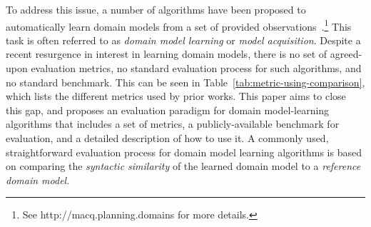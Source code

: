\documentclass[letterpaper]{article} %
\newif\ifaddcomments
\newcommand{\roni}[1]{\ifaddcomments{\textcolor{red}{[Roni: #1]}}\fi}
\newcommand{\yarin}[1]{\ifaddcomments{\textcolor{teal}{[Yarin: #1]}}\fi}
\newcommand{\cm}[1]{\ifaddcomments{\textcolor{olive}{[Christian: #1]}}\fi}
\begin{document}
To address this issue, a number of algorithms have been proposed to automatically learn domain models from a set of provided observations~\citep{macq,aineto2019learning,jimenez2012review}.\footnote{See http://macq.planning.domains for more details.} 
This task is often referred to as \emph{domain model learning} or \emph{model acquisition}. %
Despite a recent resurgence in interest in learning domain models, there is 
no set of agreed-upon evaluation metrics, 
no standard evaluation process for such algorithms, 
and no standard benchmark. 
This can be seen in Table~\ref{tab:metric-using-comparison}, which lists the different metrics used by prior works. 
This paper aims to close this gap, and proposes an evaluation paradigm for domain model-learning algorithms that includes a set of metrics, a publicly-available benchmark for evaluation, and a detailed description of how to use it. A commonly used, straightforward evaluation process for domain model learning algorithms is based on comparing the \emph{syntactic similarity} of the learned domain model to a \emph{reference domain model}. 
\end{document}
